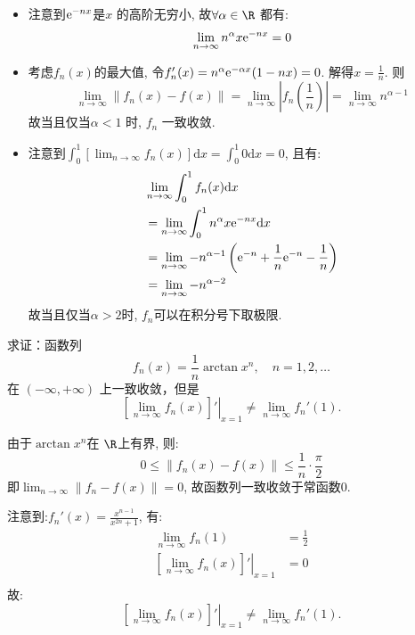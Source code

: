 \begin{solution}
    \begin{itemize}
        \item 注意到\(\mathrm{e}^{-nx}\)是\(x\) 的高阶无穷小, 故\(\forall \alpha
            \in \R\) 都有: \[
                \lim_{n \to \infty} n^{\alpha} x \mathrm{e}^{-n x} = 0
            \]
        \item 考虑\(f_{n}(x)\)的最大值, 令\(f_{n}'(x) = n^{\alpha}
            \mathrm{e}^{-\alpha x} (1 - n x) = 0\). 解得\(x =
            \frac{1}{n}\).
            则\[
                \lim_{n \to \infty} \left\lVert f_{n}(x) - f(x)
                \right\rVert = \lim_{n \to \infty} \left|
                f_{n}\left(\frac{1}{n}\right) \right| = \lim_{n \to
                \infty} n^{\alpha - 1}
            \]
            故当且仅当\(\alpha <  1\) 时, \(f_{n}\) 一致收敛.
        \item 注意到\(\int_0^1 \left[ \lim_{n \to \infty} f_n(x) \right]
            \mathrm{d}x = \int_0^1 0 \mathrm{d}x = 0\), 且有:
            \begin{align*}
                & \lim_{n \to \infty} \int_0^1 f_n(x) \mathrm{d}x \\
                & = \lim_{n \to \infty} \int_{0}^{1} n^{\alpha} x
                \mathrm{e}^{-nx} \mathrm{d}x                       \\
                & = \lim_{n \to \infty} -n^{\alpha - 1} \left(
                    \mathrm{e}^{-n} + \frac{1}{n}\mathrm{e}^{-n}
                -\frac{1}{n} \right)                               \\
                & = \lim_{n \to \infty} -n^{\alpha - 2}
            \end{align*}
            故当且仅当\(\alpha > 2\)时, \(f_{n}\)可以在积分号下取极限.
    \end{itemize}
\end{solution}

\begin{problem}
    求证：函数列
    \[
        f_n(x) = \frac{1}{n} \arctan x^n, \quad n = 1, 2, \dots
    \]
    在 \((-\infty, +\infty)\) 上一致收敛，但是
    \[
        \left. \left[ \lim_{n \to \infty} f_n(x) \right]'
        \right|_{x = 1}
        \neq \lim_{n \to \infty} f_n'(1).
    \]
\end{problem}

\begin{solution}
    由于\(\arctan x^{n}\)在 \(\R\)上有界, 则:
    \[
        0 \le  \left\lVert f_{n}(x) - f(x) \right\rVert \le
        \frac{1}{n} \cdot \frac{\pi}{2}
    \]
    即\(\lim_{n \to \infty} \left\lVert f_{n} - f(x) \right\rVert =
    0\), 故函数列一致收敛于常函数\(0\).

    注意到:\(f_{n}'(x) = \frac{x^{n - 1}}{x^{2n} + 1}\), 有:
    \begin{align*}
        \lim_{n \to \infty} f_{n}(1) & = \frac{1}{2} \\
        \left. \left[ \lim_{n \to \infty} f_{n}(x) \right]'
        \right|_{x=1}                & = 0           \\
    \end{align*}
    故: \[
        \left. \left[ \lim_{n \to \infty} f_n(x) \right]'
        \right|_{x = 1}
        \neq \lim_{n \to \infty} f_n'(1).
    \]
\end{solution}

